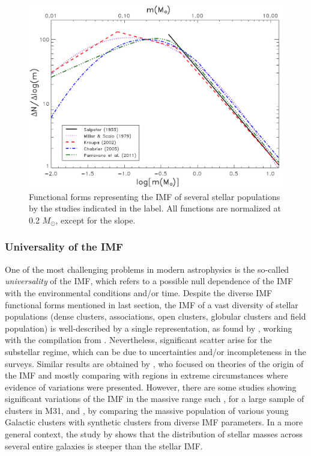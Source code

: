 \documentclass[12pt]{article}
\begin{document}
\begin{figure}[ht!]
	\includegraphics[width=1.0\textwidth]{imf_parameterization.pdf}
	\caption[IMF functional forms by various authors]{Functional forms representing the IMF of several stellar populations by the studies indicated in the label. All functions are normalized at 0.2 $M_\odot$, except for the \citet{Salpeter1955} slope.}
	\label{fig:IMFs}
\end{figure}

\subsubsection{Universality of the IMF}
One of the most challenging problems in modern astrophysics is the so-called \textit{universality} of the IMF, which refers to a possible null dependence of the IMF with the environmental conditions and/or time. Despite the diverse IMF functional forms mentioned in last section, the IMF of a vast diversity of stellar populations (dense clusters, associations, open clusters, globular clusters and field population) is well-described by a single representation, as found by \citet{Bastian2010}, working with the compilation from \citet{DeMarchi2010}. Nevertheless, significant scatter arise for the substellar regime, which can be due to uncertainties and/or incompleteness in the surveys. Similar results are obtained by \citet{Offner2014}, who focused on theories of the origin of the IMF and mostly comparing with regions in extreme circumstances where evidence of variations were presented. However, there are some studies showing significant variations of the IMF in the massive range such \citet{Weisz2015}, for a large sample of clusters in M31, and \citet{Dib2017}, by comparing the massive population of various young Galactic clusters with synthetic clusters from diverse IMF parameters. In a more general context, the study by \citet{Weidner-Kroupa2005} shows that the distribution of stellar masses across several entire galaxies is steeper than the stellar IMF.
\end{document}
